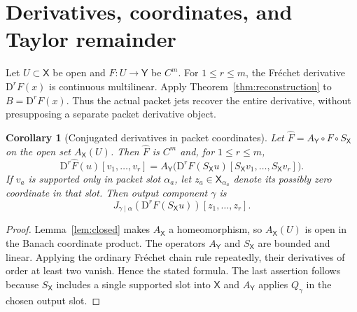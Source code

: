 \documentclass[11pt]{article}
\newtheorem{corollary}[theorem]{Corollary}
\theoremstyle{remark}\newtheorem{remark}[theorem]{Remark}
\newcommand{\X}{\mathsf X}\newcommand{\Y}{\mathsf Y}\newcommand{\Z}{\mathsf Z}
\newcommand{\D}{\mathrm D}
\begin{document}
\section{Derivatives, coordinates, and Taylor remainder}
Let $U\subset\X$ be open and $F:U\to\Y$ be $C^m$. For $1\le r\le m$, the Fr\'echet derivative $\D^rF(x)$ is continuous multilinear. Apply Theorem~\ref{thm:reconstruction} to $B=\D^rF(x)$. Thus the actual packet jets recover the entire derivative, without presupposing a separate packet derivative object.

\begin{corollary}[Conjugated derivatives in packet coordinates]\label{cor:conj}
Let $\widehat F=A_{\Y}\circ F\circ S_{\X}$ on the open set $A_{\X}(U)$. Then $\widehat F$ is $C^m$ and, for $1\le r\le m$,
\[
\D^r\widehat F(u)[v_1,\ldots,v_r]
=A_{\Y}\big(\D^rF(S_{\X}u)[S_{\X}v_1,\ldots,S_{\X}v_r]\big).
\]
If $v_a$ is supported only in packet slot $\alpha_a$, let $z_a\in\X_{\alpha_a}$ denote its possibly zero coordinate in that slot. Then output component $\gamma$ is
\[
J_{\gamma\mid\alpha}(\D^rF(S_{\X}u))[z_1,\ldots,z_r].
\]
\end{corollary}
\begin{proof}
Lemma~\ref{lem:closed} makes $A_{\X}$ a homeomorphism, so $A_{\X}(U)$ is open in the Banach coordinate product. The operators $A_{\Y}$ and $S_{\X}$ are bounded and linear. Applying the ordinary Fr\'echet chain rule repeatedly, their derivatives of order at least two vanish. Hence the stated formula. The last assertion follows because $S_{\X}$ includes a single supported slot into $\X$ and $A_{\Y}$ applies $Q_\gamma$ in the chosen output slot.
\end{proof}
\end{document}
